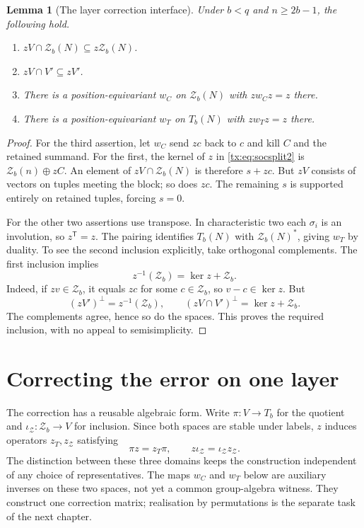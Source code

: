 \documentclass[11pt,a4paper,oneside,openany]{book}
\newtheorem{lemma}[theorem]{Lemma}
\theoremstyle{definition}\newtheorem{definition}[theorem]{Definition}
\theoremstyle{remark}\newtheorem{remark}[theorem]{Remark}
\numberwithin{equation}{chapter}
\begin{document}
\begin{lemma}[The layer correction interface]\label{tx:lem:layer-interface}
Under $b<q$ and $n\ge2b-1$, the following hold.
\begin{enumerate}
\item $zV\cap \mathcal Z_b(N)\subseteq z\mathcal Z_b(N)$.
\item $zV\cap V'\subseteq zV'$.
\item There is a position-equivariant $w_C$ on $\mathcal Z_b(N)$ with $zw_Cz=z$ there.
\item There is a position-equivariant $w_T$ on $T_b(N)$ with $zw_Tz=z$ there.
\end{enumerate}
\end{lemma}
\begin{proof}
For the third assertion, let $w_C$ send $zc$ back to $c$ and kill $C$ and the retained summand. For the first, the kernel of $z$ in \eqref{tx:eq:socsplit2} is $\mathcal Z_b(n)\oplus zC$. An element of $zV\cap \mathcal Z_b(N)$ is therefore $s+zc$. But $zV$ consists of vectors on tuples meeting the block; so does $zc$. The remaining $s$ is supported entirely on retained tuples, forcing $s=0$.

For the other two assertions use transpose. In characteristic two each $\sigma_i$ is an involution, so $z^{\mathsf T}=z$. The pairing identifies $T_b(N)$ with $\mathcal Z_b(N)^*$, giving $w_T$ by duality. To see the second inclusion explicitly, take orthogonal complements. The first inclusion implies
\[z^{-1}(\mathcal Z_b)=\ker z+\mathcal Z_b.
\]
Indeed, if $zv\in \mathcal Z_b$, it equals $zc$ for some $c\in \mathcal Z_b$, so $v-c\in\ker z$. But
\[(zV')^\perp=z^{-1}(\mathcal Z_b),\qquad
(zV\cap V')^\perp=\ker z+\mathcal Z_b.
\]
The complements agree, hence so do the spaces. This proves the required inclusion, with no appeal to semisimplicity.
\end{proof}

\section{Correcting the error on one layer}\label{tx:sec:layerstep}
The correction has a reusable algebraic form. Write $\pi:V\to T_b$ for the quotient and $\iota_{\mathcal Z}:\mathcal Z_b\to V$ for inclusion. Since both spaces are stable under labels, $z$ induces operators $z_T,z_{\mathcal Z}$ satisfying
\[
       \pi z=z_T\pi,\qquad z\iota_{\mathcal Z}=\iota_{\mathcal Z}z_{\mathcal Z}.
\]
The distinction between these three domains keeps the construction independent of any choice of representatives.
The maps $w_C$ and $w_T$ below are auxiliary inverses on these two
spaces, not yet a common group-algebra witness. They construct one
correction matrix; realisation by permutations is the separate task
of the next chapter.
\end{document}
